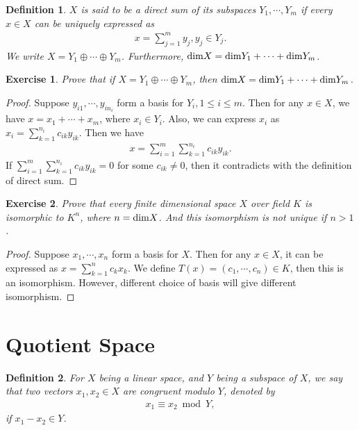 \documentclass[11pt]{book}
\newtheorem{definition}{Definition}[chapter]
\newtheorem{exercise}{Exercise}[section]
\theoremstyle{definition}
\numberwithin{equation}{chapter}
\begin{document}
\medskip

\begin{definition}
$X$ is said to be a direct sum of its subspaces $Y_1, \cdots, Y_m$ if every $x\in X$ can be uniquely expressed as
\begin{align*}
    x = \sum^m_{j=1}y_j, y_j\in Y_j.
\end{align*}
We write $X = Y_1 \oplus \cdots \oplus Y_m$. Furthermore, ${\rm dim}X = {\rm dim}Y_1 +\cdots + {\rm dim}Y_m$.
\end{definition}

\medskip

\begin{exercise}
Prove that if $X = Y_1 \oplus \cdots \oplus Y_m$, then ${\rm dim}X = {\rm dim}Y_1 +\cdots + {\rm dim}Y_m$.
\end{exercise}
\begin{proof}
Suppose $y_{i1}, \cdots, y_{in_i}$ form a basis for $Y_i, 1\leq i\leq m$. Then for any $x\in X$, we have $x = x_1 +\cdots +x_m$, where $x_i\in Y_i$. Also, we can express $x_i$ as $x_i = \sum^{n_i}_{k=1}c_{i k} y_{i k}$. Then we have 
\begin{align*}
    x = \sum^m_{i=1}\sum^{n_i}_{k=1}c_{i k} y_{i k}.
\end{align*}
If $\sum^m_{i=1}\sum^{n_i}_{k=1}c_{i k} y_{i k} = 0$ for some $c_{ik}\neq 0$, then it contradicts with the definition of direct sum.
\end{proof}

\medskip

\begin{exercise}
Prove that every finite dimensional space $X$ over field $K$ is isomorphic to $K^n$, where $n = {\rm dim}X$. And this isomorphism is not unique if $n > 1$.
\end{exercise}
\begin{proof}
Suppose $x_1,\cdots, x_n$ form a basis for $X$. Then for any $x\in X$, it can be expressed as $x = \sum^n_{k=1}c_k x_k$. We define $T(x) = (c_1, \cdots, c_n)\in K$, then this is an isomorphism. However, different choice of basis will give different isomorphism.
\end{proof}

\medskip

\section{Quotient Space}
\begin{definition}
For $X$ being a linear space, and $Y$ being a subspace of $X$, we say that two vectors $x_1, x_2\in X$ are congruent modulo $Y$, denoted by
\begin{align*}
    x_1 \equiv x_2 \bmod Y,
\end{align*}
if $x_1-x_2\in Y$.
\end{definition}
\end{document}
